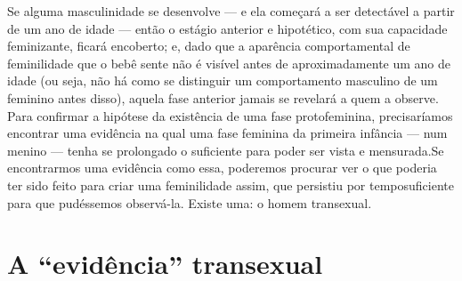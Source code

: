 Se alguma masculinidade se desenvolve --- e ela começará a ser
detectável a partir de um ano de idade --- então o estágio anterior e
hipotético, com sua capacidade feminizante, ficará encoberto; e, dado
que a aparência comportamental de feminilidade que o bebê sente não é
visível antes de aproximadamente um ano de idade (ou seja, não há como
se distinguir um comportamento masculino de um feminino antes disso),
aquela fase anterior jamais se revelará a quem a observe. Para
confirmar a hipótese da existência de uma fase protofeminina,\idxmascufas{}
precisaríamos encontrar uma evidência na qual uma fase feminina da
primeira infância --- num menino --- tenha se prolongado o suficiente
para poder ser vista e mensurada.\idxmascu[|)] Se encontrarmos uma evidência como
essa, poderemos procurar ver o que poderia ter sido feito para criar
uma feminilidade assim, que persistiu por tempo\idxmascupap[|)] suficiente para que
pudéssemos observá-la. Existe uma: o homem transexual.\idxtranse[|(]

\section{A ``evidência'' transexual}


